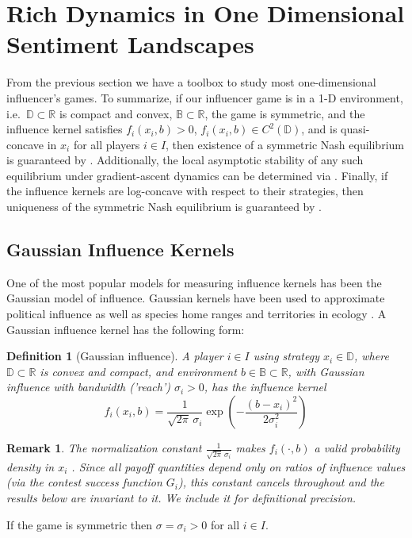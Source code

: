 \documentclass{article}
\newtheorem{definition}{Definition}
\newtheorem{remark}{Remark}
\newcommand {\R}{\mathbb{R}}
\newcommand {\D}{\mathbb{D}}
\newcommand {\B}{\mathbb{B}}
\begin{document}
    \section{Rich Dynamics in One Dimensional Sentiment Landscapes}
        From the previous section we have a toolbox to study most one-dimensional influencer's games. To summarize, if our influencer game is in a 1-D environment, i.e.\ $\D\subset \R$ is compact and convex, $\B\subset \R$, the game is symmetric, and the influence kernel satisfies $f_{i}(x_i,b)>0$, $f_{i}(x_i,b)\in C^2(\D)$, and is quasi-concave in $x_i$ for all players $i\in I$, then existence of a symmetric Nash equilibrium is guaranteed by . Additionally, the local asymptotic stability of any such equilibrium under gradient-ascent dynamics can be determined via . Finally, if the influence kernels are log-concave with respect to their strategies, then uniqueness of the symmetric Nash equilibrium is guaranteed by . 
        \subsection{Gaussian Influence Kernels}\label{subsec:SI_Gaussian}
            One of the most popular models for measuring influence kernels has been the Gaussian model of influence. Gaussian kernels have been used to approximate political influence \cite{yang2020us} as well as species home ranges and territories in ecology \cite{borger2008effects}. A Gaussian influence kernel has the following form: 
            \begin{definition}[Gaussian influence]
                A player $i\in I$ using strategy $x_i\in \D$, where $\D\subset\R$ is convex and compact, and environment $b\in\B\subset\R$, with Gaussian influence with bandwidth ('reach') $\sigma_i > 0$, has the influence kernel
                \begin{equation}\label{eq:SI_Gaussian_infl}
                    f_i(x_i,b)=\frac{1}{\sqrt{2\pi}\,\sigma_i}\exp\!\left(-\frac{(b-x_i)^2}{2\sigma_i^2}\right)
                \end{equation}
            \end{definition}
            \begin{remark}
                The normalization constant $\frac{1}{\sqrt{2\pi}\,\sigma_i}$ makes $f_i(\cdot,b)$ a valid probability density in $x_i$ \cite{billingsley1995probability}. Since all payoff quantities depend only on ratios of influence values (via the contest success function $G_i$), this constant cancels throughout and the results below are invariant to it. We include it for definitional precision.
            \end{remark}
            If the game is symmetric then $\sigma=\sigma_i>0$ for all $i\in I$. 
            
\end{document}
